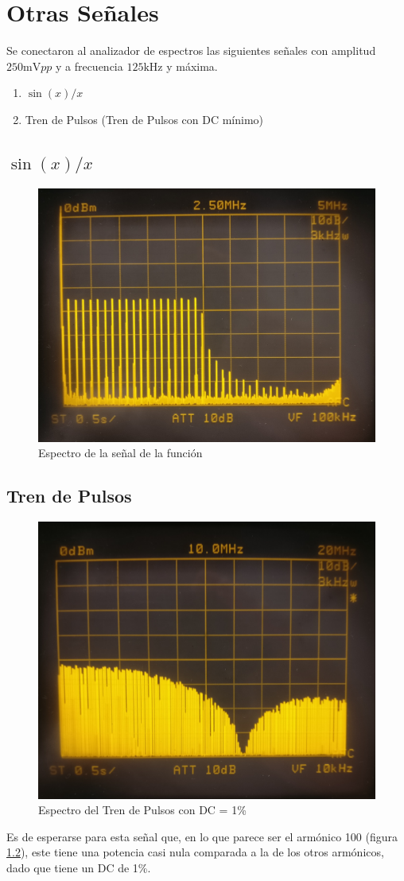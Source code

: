 \chapter{Otras Señales}
Se conectaron al analizador de espectros las siguientes
señales con amplitud $250\si{\milli\volt}pp$ y a frecuencia
$125\si{\kilo\hertz}$ y máxima.

\begin{enumerate}
    \item $\sin(x)/x$
    \item Tren de Pulsos (Tren de Pulsos con DC mínimo)
\end{enumerate}

\section{$\sin(x)/x$}
\begin{figure}[ht]
    \begin{center}
        \includegraphics[width=0.6\linewidth]{contenido/img/espectro_sinx.jpg}
        \caption{Espectro de la señal de la función}
        \label{fig:espectro_sin}
    \end{center}
\end{figure}

\section{Tren de Pulsos}

\begin{figure}[ht]
    \begin{center}
        \includegraphics[width=0.6\linewidth]{contenido/img/espectro_dc01.jpg}
        \caption{Espectro del Tren de Pulsos con DC = 1\%}
         \label{fig:espectro_tren}
    \end{center}
\end{figure}

Es de esperarse para esta señal que, en lo que parece ser el armónico 100 (figura \ref{fig:espectro_tren}), este 
tiene una potencia casi nula comparada a la de los otros armónicos, dado que tiene un DC de 1\%.